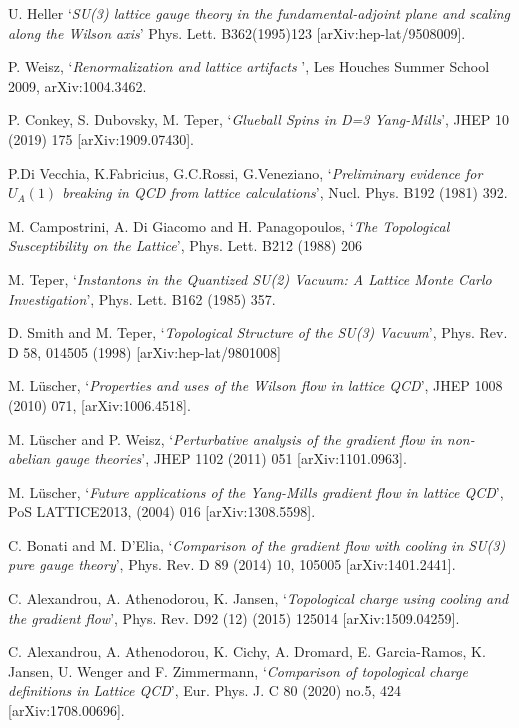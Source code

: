 \documentclass[12pt]{article}
\begin{document}
\begin{thebibliography}{99}
  U. Heller
  `{\it SU(3) lattice gauge theory in the fundamental-adjoint plane and scaling along the
    Wilson axis}'
  Phys. Lett. B362(1995)123 [arXiv:hep-lat/9508009].

   P. Weisz,
   `{\it Renormalization and lattice artifacts }',
   Les Houches Summer School 2009, arXiv:1004.3462.

  P. Conkey, S. Dubovsky, M. Teper,
  `{\it Glueball Spins in D=3 Yang-Mills}',
  JHEP 10 (2019) 175 [arXiv:1909.07430].

  P.Di Vecchia, K.Fabricius, G.C.Rossi, G.Veneziano,
  `{\it   Preliminary evidence for $U_A(1)$ breaking in QCD from lattice calculations}',
  Nucl. Phys. B192 (1981) 392.
  
  M. Campostrini, A. Di Giacomo and H. Panagopoulos,
  `{\it   The Topological Susceptibility on the Lattice}',
  Phys. Lett. B212 (1988) 206

  
  M. Teper,
  `{\it Instantons in the Quantized SU(2) Vacuum: A Lattice Monte Carlo Investigation}',
  Phys. Lett. B162 (1985) 357.

  
  D. Smith and M. Teper,
  `{\it Topological Structure of the SU(3) Vacuum}',
  Phys. Rev. D 58, 014505 (1998) [arXiv:hep-lat/9801008]


  M. L\"uscher,
  `{\it Properties and uses of the Wilson flow in lattice QCD}',
  JHEP 1008 (2010) 071, [arXiv:1006.4518]. 

  M. L\"uscher and P. Weisz,
  `{\it Perturbative analysis of the gradient flow in non-abelian gauge theories}',
  JHEP 1102 (2011) 051 [arXiv:1101.0963].

  M. L\"uscher,
  `{\it Future applications of the Yang-Mills gradient flow in lattice QCD}',
  PoS LATTICE2013, (2004) 016 [arXiv:1308.5598]. 

  C. Bonati and M. D'Elia,
  `{\it Comparison of the gradient flow with cooling in SU(3) pure gauge theory}',
  Phys. Rev. D 89 (2014) 10, 105005 [arXiv:1401.2441].

  C. Alexandrou, A. Athenodorou, K. Jansen,
  `{\it Topological charge using cooling and the gradient flow}',
  Phys. Rev. D92 (12) (2015) 125014 [arXiv:1509.04259].

  C. Alexandrou, A. Athenodorou, K. Cichy, A. Dromard, E. Garcia-Ramos, K. Jansen, U. Wenger and F. Zimmermann,
  `{\it Comparison of topological charge definitions in Lattice QCD}',
  Eur. Phys. J. C 80 (2020) no.5, 424 [arXiv:1708.00696].


\end{thebibliography}
\end{document}

